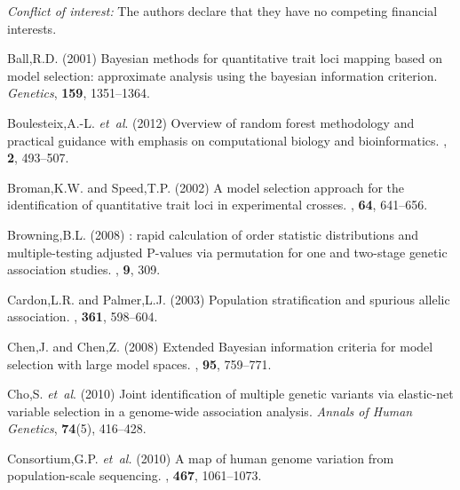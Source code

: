 \documentclass{bioinfo}
\begin{document}
\vspace{1cm}
\noindent
{\em Conflict of interest:} The authors declare that they have no
competing financial interests.


\begin{thebibliography}{}
  
Ball,R.D. (2001) Bayesian methods for quantitative trait loci mapping based on model
  selection: approximate analysis using the bayesian information criterion.
\textit{Genetics}, \textbf{159}, 1351--1364.

Boulesteix,A.-L.  \textit{et~al}. (2012)
\newblock Overview of random forest methodology and practical guidance with
  emphasis on computational biology and bioinformatics.
, {\bf 2}, 493--507.

Broman,K.W. and Speed,T.P. (2002)
\newblock A model selection approach for the identification of quantitative
  trait loci in experimental crosses.
, {\bf 64}, 641--656.

Browning,B.L. (2008)
: rapid calculation of order statistic distributions and
  multiple-testing adjusted {P}-values via permutation for one and two-stage
  genetic association studies.
, {\bf 9}, 309.

Cardon,L.R. and Palmer,L.J. (2003)
\newblock Population stratification and spurious allelic association.
, {\bf 361}, 598--604.

Chen,J. and Chen,Z. (2008)
\newblock Extended {B}ayesian information criteria for model selection with
  large model spaces.
, {\bf 95}, 759--771.



Cho,S. \textit{et~al}. (2010) Joint identification of multiple genetic variants via elastic-net
  variable selection in a genome-wide association analysis. \textit{Annals of Human Genetics}, {\bf 74}(5), 416--428.

Consortium,G.P. {\em et~al.} (2010)
\newblock A map of human genome variation from population-scale sequencing.
, {\bf 467}, 1061--1073.


\end{thebibliography}
\end{document}

